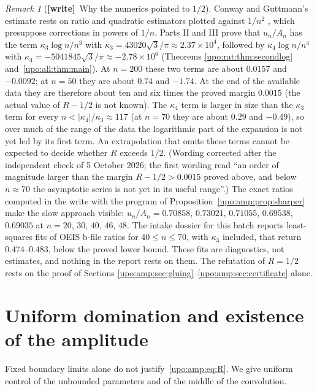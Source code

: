 \documentclass[11pt,letterpaper]{article}
\theoremstyle{remark}\newtheorem{remark}[theorem]{Remark}
\numberwithin{equation}{section}
\newcommand{\wtag}{\textup{\textbf{[write]}}}
\begin{document}
\begin{remark}[\wtag\ Why the numerics pointed to $1/2$]\label{upo:amp:rem:numerics}
Conway and Guttmann's estimate rests on ratio and quadratic estimators plotted against $1/n^2$ \cite[Section~5.1]{CG}, which presuppose corrections in powers of $1/n$. Parts II and III prove that $u_n/A_n$ has the term $\kappa_3\log n/n^3$ with $\kappa_3=43020\sqrt3/\pi\approx2.37\times10^4$, followed by $\kappa_4\log n/n^4$ with $\kappa_4=-5041845\sqrt3/\pi\approx-2.78\times10^6$ (Theorems \ref{upo:rat:thm:secondlog} and~\ref{upo:all:thm:main}). At $n=200$ these two terms are about $0.0157$ and $-0.0092$; at $n=50$ they are about $0.74$ and $-1.74$. At the end of the available data they are therefore about ten and six times the proved margin $0.0015$ (the actual value of $R-1/2$ is not known). The $\kappa_4$ term is larger in size than the $\kappa_3$ term for every $n<|\kappa_4|/\kappa_3\approx117$ (at $n=70$ they are about $0.29$ and $-0.49$), so over much of the range of the data the logarithmic part of the expansion is not yet led by its first term. An extrapolation that omits these terms cannot be expected to decide whether $R$ exceeds $1/2$. \textup{(Wording corrected after the independent check of 5 October 2026; the first wording read ``an order of magnitude larger than the margin $R-1/2>0.0015$ proved above, and below $n\approx70$ the asymptotic series is not yet in its useful range''.)} The exact ratios computed in the write with the program of Proposition~\ref{upo:amp:prop:sharper} make the slow approach visible: $u_n/A_n=0.70858$, $0.73021$, $0.71055$, $0.69538$, $0.69035$ at $n=20$, $30$, $40$, $46$, $48$. The intake dossier for this batch reports least-squares fits of OEIS b-file ratios for $40\le n\le70$, with $\kappa_3$ included, that return $0.474$--$0.483$, below the proved lower bound. These fits are diagnostics, not estimates, and nothing in the report rests on them. The refutation of $R=1/2$ rests on the proof of Sections \ref{upo:amp:sec:gluing}--\ref{upo:amp:sec:certificate} alone.
\end{remark}
\section{Uniform domination and existence of the amplitude}\label{upo:amp:sec:uniform}
Fixed boundary limits alone do not justify~\eqref{upo:amp:eq:R}. We give uniform
control of the unbounded parameters and of the middle of the convolution.
\end{document}
